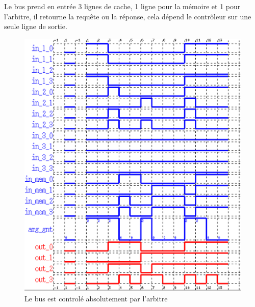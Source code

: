 \documentclass[a4paper,11pt]{report}
\begin{document}
	Le bus prend en entrée 3 lignes de cache, 1 ligne pour la mémoire et 1 pour l'arbitre, il retourne la requête ou la réponse, cela dépend le contrôleur sur une seule ligne de sortie.
	
	\begin{figure}[!htbp]	
		\includegraphics[width = 16cm]{bus_diag.png}
		\caption{Le bus est controlé absolutement par l'arbitre}
	\end{figure}
	
\end{document}
